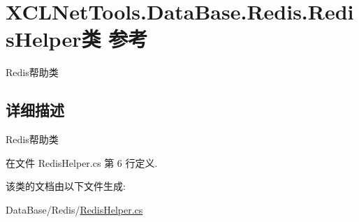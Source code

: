 \hypertarget{class_x_c_l_net_tools_1_1_data_base_1_1_redis_1_1_redis_helper}{\section{X\-C\-L\-Net\-Tools.\-Data\-Base.\-Redis.\-Redis\-Helper类 参考}
\label{class_x_c_l_net_tools_1_1_data_base_1_1_redis_1_1_redis_helper}
}


Redis帮助类  




\subsection{详细描述}
Redis帮助类 



在文件 Redis\-Helper.\-cs 第 6 行定义.



该类的文档由以下文件生成\-:\begin{DoxyCompactItemize}
\item 
Data\-Base/\-Redis/\hyperlink{_redis_helper_8cs}{Redis\-Helper.\-cs}\end{DoxyCompactItemize}
